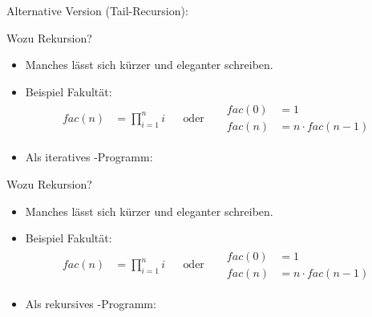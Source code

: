 \begin{fframe}
    \begin{block}{Alternative Version (\alert{Tail-Recursion}):}
    \end{block}
\end{fframe}

\begin{fframe}
    \begin{block}{Wozu Rekursion?}
    \begin{itemize}
        \item Manches lässt sich kürzer und eleganter schreiben.
        \item<2-> Beispiel Fakultät:
            \begin{align*}
                fac(n) &= \prod_{i=1}^{n}{i} & &\text{oder} & &\begin{aligned} fac(0)& = 1 \\ fac(n) &= n \cdot fac(n-1) \end{aligned}
            \end{align*}
        \item<3-> Als iteratives -Programm:
    \end{itemize}
    \end{block}
\end{fframe}

\begin{fframe}
    \begin{block}{Wozu Rekursion?}
    \begin{itemize}
        \item Manches lässt sich kürzer und eleganter schreiben.
        \item Beispiel Fakultät:
            \begin{align*}
                fac(n) &= \prod_{i=1}^{n}{i} & &\text{oder} & &\begin{aligned} fac(0)& = 1 \\ fac(n) &= n \cdot fac(n-1) \end{aligned}
            \end{align*}
        \item Als rekursives -Programm:
    \end{itemize}
    \end{block}
\end{fframe}


